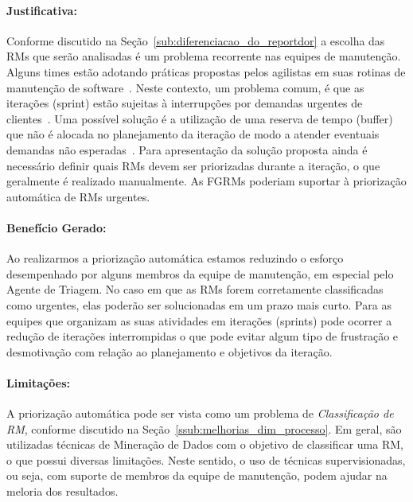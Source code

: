 \paragraph{Justificativa:}
\label{par:justificativa_s07}

Conforme discutido na Seção~\ref{sub:diferenciacao_do_reportdor} a escolha das
RMs que serão analisadas é um problema recorrente nas equipes de manutenção.
Alguns times estão adotando práticas propostas pelos agilistas em suas rotinas
de manutenção de software~\cite{svensson2005introducing}. Neste contexto, um
problema comum, é que as iterações (sprint) estão sujeitas à interrupções por
demandas urgentes de clientes~\cite{bennett2000software}. Uma possível solução é
a utilização de uma reserva de tempo (buffer) que não é alocada no planejamento
da iteração de modo a atender eventuais demandas não
esperadas~\cite{schwaber2002agile}. Para apresentação da solução proposta ainda
é necessário definir quais RMs devem ser priorizadas durante a iteração, o que
geralmente é realizado manualmente. As FGRMs poderiam suportar à priorização
automática de RMs urgentes.

\paragraph{Benefício Gerado:}
\label{par:papéis_afetados_s07}

Ao realizarmos a priorização automática estamos reduzindo o esforço desempenhado
por alguns membros da equipe de manutenção, em especial pelo Agente de Triagem.
No caso em que as RMs forem corretamente classificadas como urgentes, elas
poderão ser solucionadas em um prazo mais curto. Para as equipes que organizam
as suas atividades em iterações (sprints) pode ocorrer a redução de iterações
interrompidas o que pode evitar algum tipo de frustração e desmotivação com
relação ao planejamento e objetivos da iteração.

\paragraph{Limitações:}
\label{par:limitacoes_s07}

A priorização automática pode ser vista como um problema de
\textit{Classificação de RM}, conforme discutido na
Seção~\ref{ssub:melhorias_dim_processo}. Em geral, são utilizadas técnicas de
Mineração de Dados com o objetivo de classificar uma RM, o que possui diversas
limitações. Neste sentido, o uso de técnicas supervisionadas, ou seja, com
suporte de membros da equipe de manutenção, podem ajudar na meloria dos
resultados.

